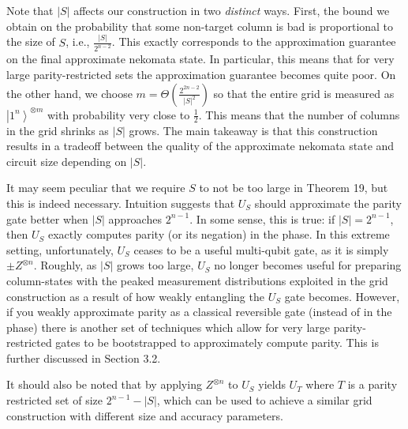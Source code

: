 \documentclass[10pt,a4paper]{article}
\begin{document}
Note that $|S|$ affects our construction in two \emph{distinct} ways. First, the bound we obtain on the probability that some non-target column is bad is proportional to the size of $S$, i.e., $\frac{|S|}{2^{n-2}}$. This exactly corresponds to the approximation guarantee on the final approximate nekomata state. In particular, this means that for very large parity-restricted sets the approximation guarantee becomes quite poor. On the other hand, we choose $m=\Theta(\frac{2^{2n-2}}{|S|^{2}})$ so that the entire grid is measured as $\left|1^{n}\right\rangle^{\otimes m}$ with probability very close to $\frac{1}{2}$. This means that the number of columns in the grid shrinks as $|S|$ grows. The main takeaway is that this construction results in a tradeoff between the quality of the approximate nekomata state and circuit size depending on $|S|$.\par




It may seem peculiar that we require $S$ to not be too large in Theorem 19, but this is indeed necessary. Intuition suggests that $U_{S}$ should approximate the parity gate better when $|S|$ approaches $2^{n-1}$. In some sense, this is true: if $|S|=2^{n-1}$, then $U_{S}$ exactly computes parity (or its negation) in the phase. In this extreme setting, unfortunately, $U_{S}$ ceases to be a useful multi-qubit gate, as it is simply $\pm Z^{\otimes n}$. Roughly, as $|S|$ grows too large, $U_{S}$ no longer becomes useful for preparing column-states with the peaked measurement distributions exploited in the grid construction as a result of how weakly entangling the $U_{S}$ gate becomes. However, if you weakly approximate parity as a classical reversible gate (instead of in the phase) there is another set of techniques which allow for very large parity-restricted gates to be bootstrapped to approximately compute parity. This is further discussed in Section 3.2.\par




It should also be noted that by applying $Z^{\otimes n}$ to $U_{S}$ yields $U_{T}$ where $T$ is a parity restricted set of size $2^{n-1}-|S|$, which can be used to achieve a similar grid construction with different size and accuracy parameters.\par
\end{document}

